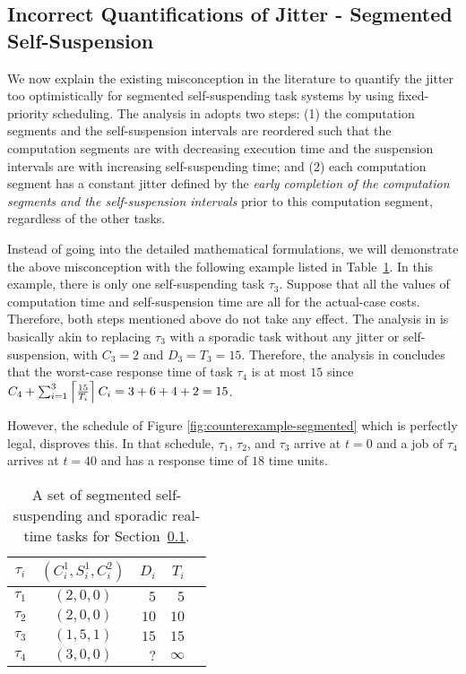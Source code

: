 \subsection{Incorrect Quantifications of Jitter - Segmented Self-Suspension}
\label{sec:wrong-jitter-segmented}


We now explain the existing misconception in the literature to quantify the jitter too optimistically for segmented self-suspending task systems by using fixed-priority scheduling.  The analysis in \cite{RTCSA-BletsasA05} adopts two steps: (1) the computation segments and the self-suspension intervals are reordered such that the computation segments are with decreasing execution time and the suspension intervals are with increasing self-suspending time; and (2) each computation segment has a constant jitter defined by the \emph{early completion of the computation segments and the self-suspension intervals} prior to this computation segment, regardless of the other tasks. 

Instead of going into the detailed mathematical formulations, we will demonstrate the above misconception with the following example listed in Table~\ref{tab:counterexample-segmented}.
In this example, there is only one self-suspending task $\tau_3$. Suppose that all the values of computation time and self-suspension time are all for the actual-case costs. Therefore, both steps mentioned above do not take any effect. The analysis in \cite{RTCSA-BletsasA05} is basically akin to replacing $\tau_3$ with a sporadic task without any jitter or self-suspension, with $C_3=2$ and $D_3=T_3=15$. Therefore, the analysis in \cite{RTCSA-BletsasA05}  concludes that the worst-case response time of task $\tau_4$ is at most $15$ since $C_4+\sum_{i=1}^{3}\left\lceil{\frac{15}{T_i}}\right\rceil C_i = 3+ 6 + 4 + 2= 15$.


However, the schedule of Figure \ref{fig:counterexample-segmented} which is perfectly legal, disproves this.
In that schedule, $\tau_1$, $\tau_2$, and $\tau_3$ arrive at $t=0$ and a job of $\tau_4$ arrives at $t=40$ and has a response time of 
$18$ time units.

\begin{table}[t]
\begin{center}
\begin{tabular}{|c||c|r|r|r|}
\hline
$\tau_i$ & $(C_i^1, S_i^1, C_i^2)$   &   $D_i$  &     $T_i$     \\ \hline
$\tau_1$ &  $(2, 0, 0)$                    &     $5$  &       $5$     \\ \hline
$\tau_2$ &  $(2, 0, 0)$                    &    $10$  &      $10$     \\ \hline
$\tau_3$ &  $(1, 5, 1)$            &    $15$  &      $15$     \\ \hline
$\tau_4$ &  $(3, 0, 0)$                   &    $?$  &   $\infty$    \\ \hline     
\end{tabular}
\end{center}
\caption{A set of segmented self-suspending and sporadic real-time tasks for Section~\ref{sec:wrong-jitter-segmented}.}
\label{tab:counterexample-segmented}
\end{table}




